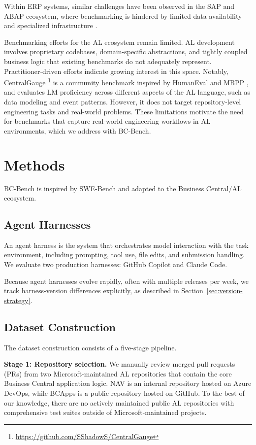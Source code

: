\documentclass{article}
\begin{document}
Within ERP systems, similar challenges have been observed in the SAP and ABAP ecosystem, where benchmarking is hindered by limited data availability and specialized infrastructure \cite{wallraven_benchmarking_2026}.

Benchmarking efforts for the AL ecosystem remain limited. AL development involves proprietary codebases, domain-specific abstractions, and tightly coupled business logic that existing benchmarks do not adequately represent. Practitioner-driven efforts indicate growing interest in this space. Notably, CentralGauge \footnote{\href{https://github.com/SShadowS/CentralGauge}{https://github.com/SShadowS/CentralGauge}} is a community benchmark inspired by HumanEval \cite{chen_evaluating_2021} and MBPP \cite{austin_program_2021}, and evaluates LM proficiency across different aspects of the AL language, such as data modeling and event patterns. However, it does not target repository-level engineering tasks and real-world problems. These limitations motivate the need for benchmarks that capture real-world engineering workflows in AL environments, which we address with BC-Bench.

\section{Methods}

BC-Bench is inspired by SWE-Bench and adapted to the Business Central/AL ecosystem.

\subsection{Agent Harnesses}

An agent harness is the system that orchestrates model interaction with the task environment, including prompting, tool use, file edits, and submission handling. We evaluate two production harnesses: GitHub Copilot and Claude Code.

Because agent harnesses evolve rapidly, often with multiple releases per week, we track harness-version differences explicitly, as described in Section~\ref{sec:version-strategy}.

\subsection{Dataset Construction}

The dataset construction consists of a five-stage pipeline.

\textbf{Stage 1: Repository selection.} We manually review merged pull requests (PRs) from two Microsoft-maintained AL repositories that contain the core Business Central application logic. NAV is an internal repository hosted on Azure DevOps, while BCApps is a public repository hosted on GitHub. To the best of our knowledge, there are no actively maintained public AL repositories with comprehensive test suites outside of Microsoft-maintained projects.
\end{document}
